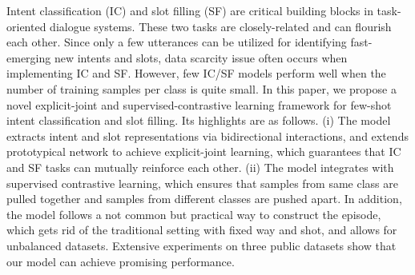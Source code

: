 Intent classification (IC) and slot filling (SF) are critical building blocks in task-oriented dialogue systems. These two tasks are closely-related and can flourish each other. Since only a few utterances can be utilized for identifying fast-emerging new intents and slots, data scarcity issue often occurs when implementing IC and SF. However, few IC/SF models perform well when the number of training samples per class is quite small. In this paper, we propose a novel explicit-joint and supervised-contrastive learning framework for few-shot intent classification and slot filling. Its highlights are as follows. (i) The model extracts intent and slot representations via bidirectional interactions, and extends prototypical network to achieve explicit-joint learning, which guarantees that IC and SF tasks can mutually reinforce each other. (ii) The model integrates with supervised contrastive learning, which ensures that samples from same class are pulled together and samples from different classes are pushed apart. In addition, the model follows a not common but practical way to construct the episode, which gets rid of the traditional setting with fixed way and shot, and allows for unbalanced datasets. Extensive experiments on three public datasets show that our model can achieve promising performance.
